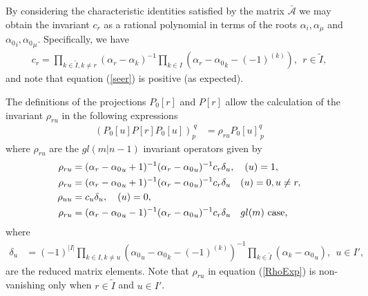 \documentclass[12pt]{article}
\def\nn{\nonumber}
\begin{document}
By considering the characteristic identities satisfied by the matrix $\bar{\mathcal{A}}$ we may obtain the invariant $c_r$ as a rational polynomial in terms of the roots $\alpha_i,\alpha_\mu$ and ${\alpha_0}_i,{\alpha_0}_\mu$. Specifically, we have \cite{GIW1}
\begin{align}
c_r = \prod_{k\in \tilde{I},k\neq r} \left(\alpha_r - \alpha_k \right)^{-1}\prod_{k\in
I} \left(\alpha_r - {\alpha_0}_k - (-1)^{(k)}\right),\ \ r\in \tilde{I} ,
\label{seer}
\end{align}
and note that equation (\ref{seer}) is positive (as expected).

The definitions of the projections ${P_0}[r]$ and ${P}[r]$ allow the calculation of the invariant ${\rho}_{ru}$ in the following expressions \cite{GIW2}
\begin{align}
({P_0}[u]{P}[r]{P_0}[u])_p^{\ q} &= {\rho}_{ru}{P_0}[u]_{\ p}^q 
\end{align}
where ${\rho}_{ru}$ are the $gl(m|n-1)$ invariant operators given by
\begin{align}
{\rho}_{ru} &= ({\alpha}_r-{\alpha_0}_u +
1)^{-1}({\alpha}_r-{\alpha_0}_u)^{-1}{c}_r{\delta}_u, \ \ \ (u) = 1, \nn\\
{\rho}_{ru} &= ({\alpha}_r-{\alpha_0}_u +
1)^{-1}({\alpha}_r-{\alpha_0}_u)^{-1}{c}_r{\delta}_u \ \ \ (u) = 0, u \neq r,
\nn\\
{\rho}_{uu} &= {c}_u {\delta}_u, \ \ \ (u) = 0, \nn\\
{\rho}_{ru} &= ({\alpha}_r-{\alpha_0}_u -
1)^{-1}({\alpha}_r-{\alpha_0}_u)^{-1}{c}_r {\delta}_u \ \ \ gl(m)
\hbox{~case,} 
\label{RhoExp}
\end{align}
where 
\begin{align}
\delta_u &= (-1)^{|I|} \prod_{k\in I,k\neq u} \left({\alpha_0}_u - {\alpha_0}_k -
(-1)^{(k)}\right)^{-1}\prod_{k\in\tilde{I}} \left(\alpha_k - {\alpha_0}_u \right),\ \ u\in I',
\end{align}
are the reduced matrix elements.
Note that ${\rho}_{ru}$ in equation (\ref{RhoExp}) is non-vanishing only when $r\in \tilde{I}$ and $u\in I'$.
\end{document}
